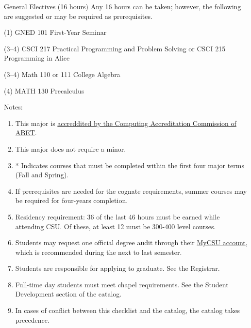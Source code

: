 \begin{reqgroup}{General Electives (16 hours)}
Any 16 hours can be taken; however, the following are suggested or may be required as prerequisites.
\begin{checklist}
\begin{minipage}[t]{\linewidth}
	\item (1)	GNED 101	First-Year Seminar
	\item (3--4)	CSCI 217	Practical Programming and Problem Solving or CSCI 215	Programming in Alice
	\item (3--4) Math 110 or 111 College Algebra
	\item (4) MATH 130 Precalculus
	\blankReq
\end{minipage}
\end{checklist}
\end{reqgroup}

Notes:%
\begin{enumerate}\footnotesize
	\item This major is
		\href{https://www.abet.org/accreditation/what-is-accreditation/why-abet-accreditation-matters/}{accreddited by the Computing Accreditation Commission of ABET}.
	\item This major does not require a minor.
	\item * Indicates courses that must be completed within the first four major terms (Fall and Spring).
	\item If prerequisites are needed for the cognate requirements, summer courses may be required for four-years completion.
	\item Residency requirement: 36 of the last 46 hours must be earned while attending CSU. Of these, at least 12 must be 300-400 level courses.
	\item Students may request one official degree audit through their \href{https://portal.csuniv.edu/}{MyCSU account}, which is recommended during the next to last semester.
	\item Students are responsible for applying to graduate. See the Registrar.
	\item Full-time day students must meet chapel requirements. See the Student Development section of the catalog.
	\item In cases of conflict between this checklist and the catalog, the catalog takes precedence.
\end{enumerate}